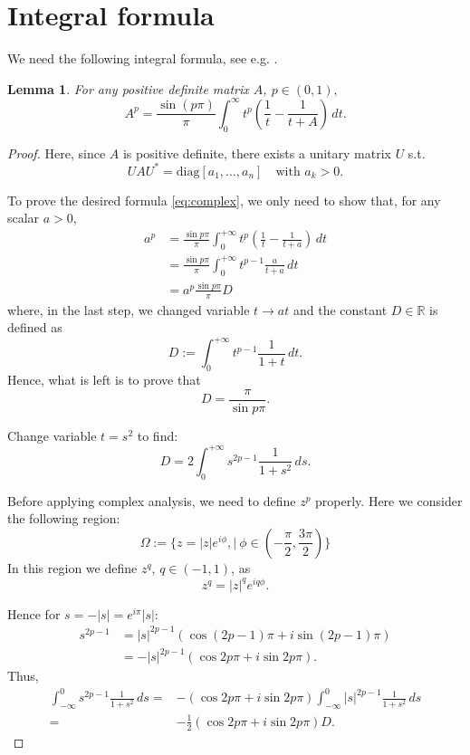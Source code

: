 \documentclass{article}
\numberwithin{equation}{section}
\newtheorem{lemma}[theorem]{Lemma}
\begin{document}
\section{Integral formula}
We need the following integral formula, see e.g. \cite{carlen2010trace, bhatia97}.

\begin{lemma}\label{LM:integral}
For any positive definite matrix $A$, $p\in (0,1),$
\begin{equation}\label{eq:complex}
A^{p}
= \frac{\sin(p\pi)}{\pi } \int_{0}^{\infty} t^{p} \left( \frac{1}{t} - \frac{1}{t + A} \right)\, dt.
\end{equation}
\end{lemma}
\begin{proof}
  Here, since $A$ is positive definite, there exists a unitary matrix $U$ s.t.
\[ UAU^* = \text{diag} [a_1, \dots, a_n] \quad \text{with } a_k > 0. \]

To prove the desired formula \eqref{eq:complex}, we only need to show that, for any scalar $a > 0$,
\begin{align*}
    a^p &= \frac{\sin p\pi}{\pi} \int_{0}^{+\infty} t^p \left( \frac{1}{t} - \frac{1}{t+a} \right) \, dt \\
    &= \frac{\sin p\pi}{\pi} \int_{0}^{+\infty} t^{p-1} \frac{a}{t+a} \, dt \\
    &= a^p \frac{\sin p\pi}{\pi} D
\end{align*}
where, in the last step, we changed variable $t \to at$ and the constant $D\in \mathbb{R}$ is defined as 
\[ D := \int_{0}^{+\infty} t^{p-1} \frac{1}{1+t} \, dt. \]
Hence, what is left is to prove that
\begin{equation}\label{eq:claimD}
  D=\frac{\pi}{\sin p\pi}.
\end{equation}

Change variable $t = s^2$ to find:
\[ D = 2 \int_{0}^{+\infty} s^{2p-1} \frac{1}{1+s^2} \, ds .\]

Before applying complex analysis, we need to define $z^p$ properly. Here we consider the following region:
\begin{equation}
\Omega:=\Big\{   z = |z|e^{i\phi}, \Big|\  \phi \in \left( -\frac{\pi}{2}, \frac{3\pi}{2} \right)\Big\}
\end{equation} In this region we define $z^{q}$, $q\in (-1,1)$, as
\[  z^q = |z|^q e^{i q \phi}. \]

Hence for $s = -|s| = e^{i\pi} |s|$:
\begin{align*}
    s^{2p-1} &= |s|^{2p-1} \left( \cos(2p-1)\pi + i \sin(2p-1)\pi \right) \\
    &= -|s|^{2p-1} \left( \cos 2p\pi + i \sin 2p\pi \right).
\end{align*}
Thus,
\begin{align*}
  \int_{-\infty}^{0} s^{2p-1} \frac{1}{1+s^2} \, ds =& -(\cos 2p\pi + i \sin 2p\pi) \int_{-\infty}^{0} |s|^{2p-1} \frac{1}{1+s^2} \, ds \\
 =& -\frac{1}{2} (\cos 2p\pi + i \sin 2p\pi) D.
 \end{align*}


\end{proof}
\end{document}
